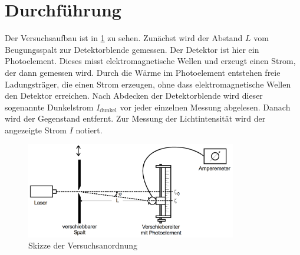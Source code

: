 \section{Durchführung}
\label{sec:Durchführung}

Der Versuchsaufbau ist in \ref{fig:aufbau} zu sehen. Zunächst wird der Abstand $L$
vom Beugungsspalt zur Detektorblende gemessen. Der Detektor ist hier ein Photoelement.
Dieses misst elektromagnetische Wellen und erzeugt einen Strom, der dann gemessen wird.
Durch die Wärme im Photoelement entstehen freie Ladungsträger, die einen Strom erzeugen,
ohne dass elektromagnetische Wellen den Detektor erreichen. Nach Abdecken der Detektorblende
wird dieser sogenannte Dunkelstrom $I_\text{dunkel}$ vor jeder einzelnen Messung abgelesen.
Danach wird der Gegenstand entfernt. Zur Messung der Lichtintensität wird der
angezeigte Strom $I$ notiert.

\begin{figure}
  \centering
  \includegraphics[width=260pt]{data/aufbau.png}
  \caption{Skizze der Versuchsanordnung \cite{Versuchsanleitung}}
  \label{fig:aufbau}
\end{figure}

